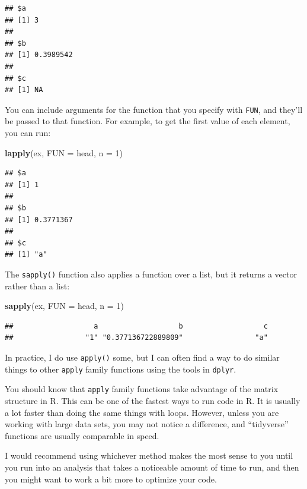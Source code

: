 \documentclass[]{book}
\makeatletter
\newenvironment{Shaded}{\begin{snugshade}}{\end{snugshade}}
\newcommand{\KeywordTok}[1]{\textcolor[rgb]{0.13,0.29,0.53}{\textbf{#1}}}
\newcommand{\DataTypeTok}[1]{\textcolor[rgb]{0.13,0.29,0.53}{#1}}
\newcommand{\DecValTok}[1]{\textcolor[rgb]{0.00,0.00,0.81}{#1}}
\newcommand{\NormalTok}[1]{#1}
\newenvironment{kframe}{%
\medskip{}
\setlength{\fboxsep}{.8em}
 \def\at@end@of@kframe{}%
 \ifinner\ifhmode%
  \def\at@end@of@kframe{\end{minipage}}%
  \begin{minipage}{\columnwidth}%
 \fi\fi%
 \def\FrameCommand##1{\hskip\@totalleftmargin \hskip-\fboxsep
 \colorbox{shadecolor}{##1}\hskip-\fboxsep
     \hskip-\linewidth \hskip-\@totalleftmargin \hskip\columnwidth}%
 \MakeFramed {\advance\hsize-\width
   \@totalleftmargin\z@ \linewidth\hsize
   \@setminipage}}%
 {\par\unskip\endMakeFramed%
 \at@end@of@kframe}
\renewenvironment{Shaded}{\begin{kframe}}{\end{kframe}}
\theoremstyle{definition}
\theoremstyle{definition}
\theoremstyle{definition}
\theoremstyle{remark}
\makeatother
\begin{document}
\begin{verbatim}
## $a
## [1] 3
## 
## $b
## [1] 0.3989542
## 
## $c
## [1] NA
\end{verbatim}

You can include arguments for the function that you specify with
\texttt{FUN}, and they'll be passed to that function. For example, to
get the first value of each element, you can run:

\begin{Shaded}
\begin{Highlighting}[]
\KeywordTok{lapply}\NormalTok{(ex, }\DataTypeTok{FUN =}\NormalTok{ head, }\DataTypeTok{n =} \DecValTok{1}\NormalTok{)}
\end{Highlighting}
\end{Shaded}

\begin{verbatim}
## $a
## [1] 1
## 
## $b
## [1] 0.3771367
## 
## $c
## [1] "a"
\end{verbatim}

The \texttt{sapply()} function also applies a function over a list, but
it returns a vector rather than a list:

\begin{Shaded}
\begin{Highlighting}[]
\KeywordTok{sapply}\NormalTok{(ex, }\DataTypeTok{FUN =}\NormalTok{ head, }\DataTypeTok{n =} \DecValTok{1}\NormalTok{)}
\end{Highlighting}
\end{Shaded}

\begin{verbatim}
##                   a                   b                   c 
##                 "1" "0.377136722889809"                 "a"
\end{verbatim}

In practice, I do use \texttt{apply()} some, but I can often find a way
to do similar things to other \texttt{apply} family functions using the
tools in \texttt{dplyr}. \bigskip

You should know that \texttt{apply} family functions take advantage of
the matrix structure in R. This can be one of the fastest ways to run
code in R. It is usually a lot faster than doing the same things with
loops. However, unless you are working with large data sets, you may not
notice a difference, and ``tidyverse'' functions are usually comparable
in speed. \bigskip

I would recommend using whichever method makes the most sense to you
until you run into an analysis that takes a noticeable amount of time to
run, and then you might want to work a bit more to optimize your code.
\bigskip
\end{document}

